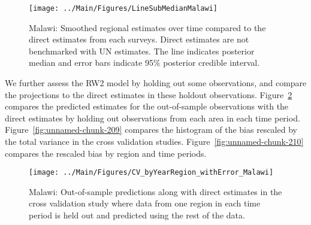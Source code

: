 \documentclass[12pt]{article}\usepackage[]{graphicx}\usepackage[]{color}
\newenvironment{knitrout}{}{} %
\begin{document}
\begin{knitrout}
\color{fgcolor}\begin{figure}[bht]

{\centering \texttt{[image: ../Main/Figures/LineSubMedianMalawi]} 

}

\caption[Malawi]{Malawi: Smoothed regional estimates over time compared to the direct estimates from each surveys. Direct estimates are not benchmarked with UN estimates. The line indicates posterior median and error bars indicate 95\% posterior credible interval.}\label{fig:unnamed-chunk-207}
\end{figure}


\end{knitrout}
We further assess the RW2 model by holding out some observations, and compare the projections to the direct estimates in these holdout observations. Figure~\ref{fig:unnamed-chunk-208} compares the predicted estimates for the out-of-sample observations  with the direct estimates by holding out observations from each area in each time period.  Figure~\ref{fig:unnamed-chunk-209} compares the histogram of the bias rescaled by the total variance in the cross validation studies. Figure~\ref{fig:unnamed-chunk-210} compares the rescaled bias by region and time periods.



 
\begin{knitrout}
\color{fgcolor}\begin{figure}[bht]

{\centering \texttt{[image: ../Main/Figures/CV\_byYearRegion\_withError\_Malawi]} 

}

\caption[Malawi]{Malawi: Out-of-sample predictions along with direct estimates in the cross validation study where data from one region in each time period is held out and predicted using the rest of the data.}\label{fig:unnamed-chunk-208}
\end{figure}


\end{knitrout}
\end{document}
